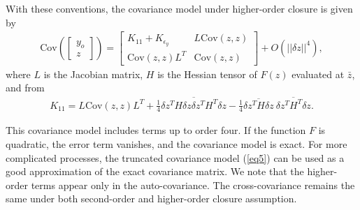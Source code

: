 \documentclass[article,ij4uq]{ij4uq}              %
\begin{document}
 \par With these conventions, the covariance model under higher-order closure is given by \cite{CovModel}
\begin{align}
    \mathrm{Cov}\left( \begin{bmatrix}y_{o}\\z\end{bmatrix} \right)=\begin{bmatrix}K_{11}+K_{\epsilon_{y}} & L\mathrm{Cov}(z,z)\\\mathrm{Cov}(z,z)L^{T} & \mathrm{Cov}(z,z)\end{bmatrix}+O(||\delta z||^{4}),\label{eq5}
\end{align}
where $L$ is the Jacobian matrix, $H$ is the Hessian tensor of $F(z)$ evaluated at $\bar{z}$, and from \cite{CovModel}
\begin{align}
    K_{11}=L\mathrm{Cov}(z,z)L^{T}+\frac{1}{4}\overline{\delta z^{T}H\delta z\delta z^{T}H^{T}\delta z}-\frac{1}{4}\overline{\delta z^{T}H\delta z}\ \overline{\delta z^{T}H^{T}\delta z}.\label{eq6}
\end{align}
\par This covariance model includes terms up to order four. If the function $F$ is quadratic, the error term vanishes, and the covariance model is exact. For more complicated processes, the truncated covariance model (\ref{eq5}) can be used as a good approximation of the exact covariance matrix. We note that the higher-order terms  appear only in the auto-covariance. The cross-covariance remains the same under both second-order and higher-order closure assumption.
\end{document}

